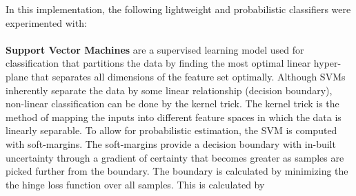 In this implementation, the following lightweight and probabilistic classifiers were experimented with:
\\
\\
\textbf{Support Vector Machines} are a supervised learning model used for classification that partitions the data by finding the most optimal linear hyper-plane that separates all dimensions of the feature set optimally. Although SVMs inherently separate the data by some linear relationship (decision boundary), non-linear classification can be done by the kernel trick. The kernel trick is the method of mapping the inputs into different feature spaces in which the data is linearly separable. To allow for probabilistic estimation, the SVM is computed with soft-margins. The soft-margins provide a decision boundary with in-built uncertainty through a gradient of certainty that becomes greater as samples are picked further from the boundary. The boundary is calculated by minimizing the the hinge loss function over all samples. This is calculated by

